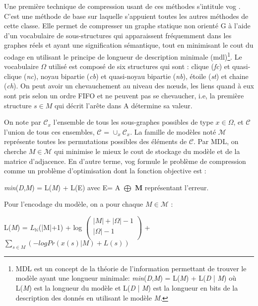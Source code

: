 
Une première technique de compression usant de ces méthodes s'intitule 
\gls{vog}
 \citep{koutra2015summarizing}. C'est une méthode de base sur laquelle s'appuient toutes les autres méthodes de cette classe. Elle permet de compresser un graphe statique non orienté G à l'aide d'un vocabulaire de sous-structures qui apparaissent fréquemment dans les graphes réels et ayant  une signification sémantique, tout en minimisant le cout du codage en utilisant le principe de longueur de description minimale (\gls{mdl})\footnote{MDL est un concept de la théorie de l'information permettant de trouver le modèle ayant une longueur minimale: \textit{min}(\textit{D},\textit{M}) = L(\textit{M}) + L(\textit{D} | \textit{M}) où L(\textit{M}) est la longueur du modèle et L(\textit{D} | \textit{M}) est la longueur en bits de la description des donnés en utilisant le modèle \textit{M}.}. 
Le vocabulaire $\Omega$ utilisé est composé de six structures qui sont : clique (\textit{fc}) et quasi-clique (\textit{nc}), noyau bipartie (\textit{cb}) et quasi-noyau bipartie (\textit{nb}), étoile (\textit{st}) et chaine (\textit{ch}). On peut avoir un chevauchement au niveau des nœuds, les liens quand à eux sont pris selon un ordre FIFO et ne peuvent pas se chevaucher, i.e, la première structure $ s \in \textit{M} $ qui décrit l'arête dans A détermine sa valeur.

On note par $\mathcal{C}_{x}$ l'ensemble de tous les sous-graphes possibles de type $x \in \Omega$, et $\mathcal{C}$ l'union de tous ces ensembles, $\mathcal{C}$ = ${\cup}_{x}\mathcal{C}_{x}$. La famille de modèles noté $\mathcal{M}$ représente toutes les permutations possibles des éléments de $\mathcal{C}$. Par MDL, on cherche $\textit{M} \in \mathcal{M}$ qui minimise le mieux le cout de stockage du modèle et de la matrice d'adjacence.
En d'autre terme, \gls{vog} formule le problème de compression comme un problème d'optimisation dont la fonction objective est :
 
 
 \textit{min}(\textit{D},\textit{M}) = L(\textit{M}) + L(E) avec E= A $\bigoplus$ $\mathbf{M} $ représentant l'erreur. 

Pour l'encodage du modèle, on a pour chaque $\textit{M} \in  \mathcal{M}$ : 

\begin{center}
L(\textit{M}) = $L_{\mathbb{N}}$(|M|+1) + log $\left( \begin{array}{c}
|\textit{M}| + |\Omega| -1 \\
|\Omega| -1 \\
\end{array} \right)$ + $\sum\limits_{s  \in \textit{M}} ( - log Pr(x(s)  |  \textit{M} ) + L(s) )$\\
\end{center}

